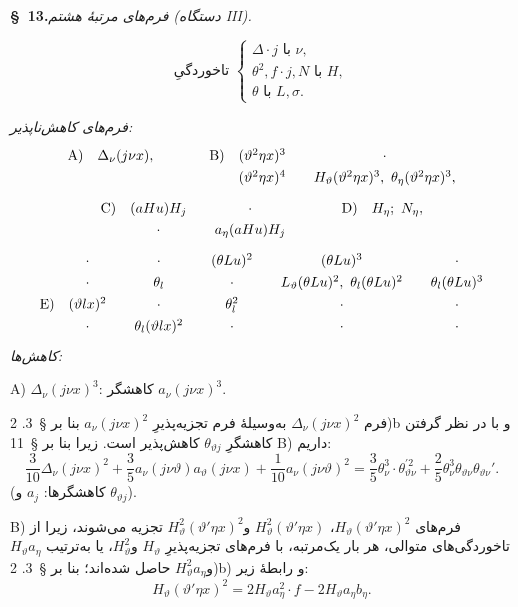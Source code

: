 \documentclass[11pt]{article}
\providecommand{\A}{\Delta}
\begin{document}
\begin{center}
\textbf{\S\ 13.}\quad\emph{فرم‌های مرتبهٔ هشتم (دستگاه III).}
\end{center}
\[
\text{تاخوردگیِ }\left\{\begin{array}{l}
\A\cdot j\text{ با }\nu,\\
\theta^2,
 f\cdot j,
 N\text{ با }H,\\
\theta\text{ با }L,\sigma.
\end{array}\right.
\]


\noindent\emph{فرم‌های کاهش‌ناپذیر:}
\[
\renewcommand{\arraystretch}{1.28}
\begin{array}{@{}r@{\quad}c@{\qquad\qquad}r@{\quad}c@{\qquad}c@{}}
\text{A)}&\A_\nu(j\nu x),&\text{B)}&(\vartheta^2\eta x)^3&\cdot\\
&&&(\vartheta^2\eta x)^4&H_\vartheta(\vartheta^2\eta x)^3,\ \theta_\eta(\vartheta^2\eta x)^3,
\end{array}
\]
\[
\renewcommand{\arraystretch}{1.28}
\begin{array}{@{}r@{\quad}c@{\qquad}c@{\qquad\qquad}r@{\quad}c@{}}
\text{C)}&(aHu)H_j&\cdot&\text{D)}&H_\eta;\ N_\eta,\\
&\cdot&a_\eta(aHu)H_j&&
\end{array}
\]
\[
\renewcommand{\arraystretch}{1.30}
\begin{array}{@{}r@{\quad}c@{\qquad}c@{\qquad}c@{\qquad}c@{\qquad}c@{}}
&\cdot&\cdot&(\theta Lu)^2&(\theta Lu)^3&\cdot\\
&\cdot&\theta_l&\cdot&L_\vartheta(\theta Lu)^2,\ \theta_l(\theta Lu)^2&\theta_l(\theta Lu)^3\\
\text{E)}&(\vartheta lx)^2&\cdot&\theta_l^2&\cdot&\cdot\\
&\cdot&\theta_l(\vartheta lx)^2&\cdot&\cdot&\cdot
\end{array}
\]
\noindent\emph{کاهش‌ها:}

\noindent A) $\A_\nu(j\nu x)^3$: کاهشگر $a_\nu(j\nu x)^3$.

فرم $\A_\nu(j\nu x)^2$ به‌وسیلهٔ فرم تجزیه‌پذیرِ $a_\nu(j\nu x)^2$ بنا بر \S\ 3. 2)b و با در نظر گرفتن کاهشگرِ $\theta_{\vartheta j}$ کاهش‌پذیر است. زیرا بنا بر \S\ 11 B) داریم:
\[
\frac3{10}\A_\nu(j\nu x)^2+\frac35a_\nu(j\nu\vartheta)a_\vartheta(j\nu x)
+\frac1{10}a_\nu(j\nu\vartheta)^2
=\frac35\theta_\nu^3\cdot\theta_{\vartheta\nu}^{\prime2}+\frac25\theta_\nu^3\theta_{\vartheta\nu}\theta_{\vartheta\nu}'.
\]
(کاهشگرها: $a_j$ و $\theta_{\vartheta j}$).

\noindent B) فرم‌های $H_\vartheta(\vartheta'\eta x)^2$، $H_\vartheta^2(\vartheta'\eta x)$ و$H_\vartheta^2(\vartheta'\eta x)^2$ تجزیه می‌شوند، زیرا از تاخوردگی‌های متوالی، هر بار یک‌مرتبه، با فرم‌های تجزیه‌پذیرِ $H_\vartheta$ و$H_\vartheta^2$، یا به‌ترتیب $H_\vartheta a_\eta$ و$H_\vartheta^2a_\eta$ حاصل شده‌اند؛ بنا بر \S\ 3. 2)b) و رابطهٔ زیر:
\[
H_\vartheta(\vartheta'\eta x)^2=2H_\vartheta a_\eta^2\cdot f-2H_\vartheta a_\eta b_\eta.
\]
\end{document}
